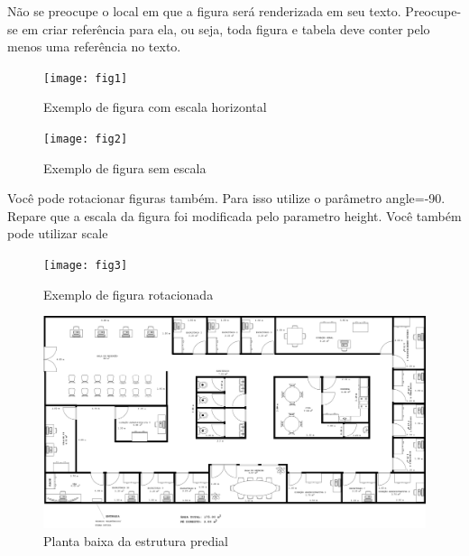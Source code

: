 \documentclass[	DIV=calc,%
							paper=a4,%
							fontsize=12pt,%
							onecolumn]{scrartcl}	 					%
\begin{document}
Não se preocupe o local em que a figura será renderizada em seu texto. Preocupe-se em criar referência para ela, ou seja, toda figura e tabela deve conter pelo menos uma referência no texto.

\begin{figure}
\centering
\texttt{[image: fig1]}
\caption{Exemplo de figura com escala horizontal}
\label{fig1}
\end{figure}


\begin{figure}
	\centering
	\texttt{[image: fig2]}
	\caption{Exemplo de figura sem escala}
	\label{fig2}
\end{figure}

Você pode rotacionar figuras também. Para isso utilize o parâmetro angle=-90. Repare que a escala da figura foi modificada pelo parametro height. Você também pode utilizar scale

\begin{figure}
	\centering
	\texttt{[image: fig3]}
	\caption{Exemplo de figura rotacionada}
	\label{fig3}
\end{figure}

\begin{figure}
	\includegraphics[height=\textwidth,angle=-90,scale=0.8]{planta2d}
	\caption{Planta baixa da estrutura predial}
	\label{planta2d}
\end{figure}
\end{document}
